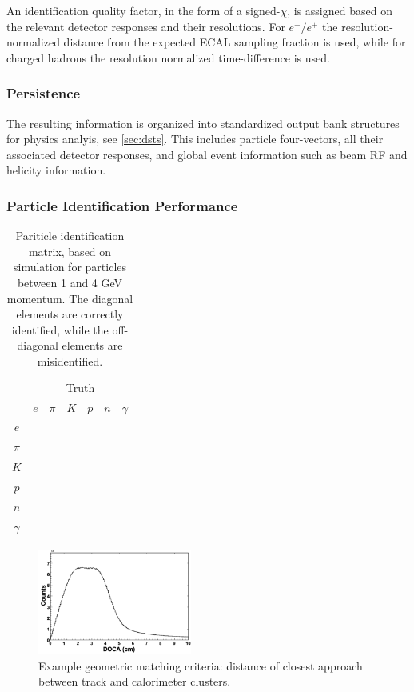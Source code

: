 An identification quality factor, in the form of a signed-$\chi$, is assigned based on the relevant detector responses and their resolutions.  For $e^-/e^+$ the resolution-normalized distance from the expected ECAL sampling fraction is used, while for charged hadrons the resolution normalized time-difference is used.

\subsubsection{Persistence}
The resulting information is organized into standardized output bank structures for physics analyis, see \ref{sec:dsts}.  This includes particle four-vectors, all their associated detector responses, and global event information such as beam RF and helicity information.


\subsubsection{Particle Identification Performance}

\begin{table}[htpb]
  \begin{center}
    \label{tab:pidmatrix}
    \begin{tabular}{|c|cccccc|}\hline
          & \multicolumn{6}{c|}{Truth}\\        
          & $e$ & $\pi$ & $K$ & $p$ & $n$ & $\gamma$ \\\hline
  $e$     &     &       &     &     &     &          \\ 
  $\pi$   &     &       &     &     &     &          \\ 
  $K$     &     &       &     &     &     &          \\ 
  $p$     &     &       &     &     &     &          \\ 
  $n$     &     &       &     &     &     &          \\ 
 $\gamma$ &     &       &     &     &     &          \\\hline 
    \end{tabular}
  \caption{Pariticle identification matrix, based on simulation for particles between 1 and 4 GeV momentum.  The diagonal elements are correctly identified, while the off-diagonal elements are misidentified.}
  \end{center}
\end{table}

\begin{figure}
\centering
\includegraphics[width=0.45\textwidth,height=0.2\textheight]{pics/pcal-doca.png}
\caption{Example geometric matching criteria:  distance of closest approach between track and calorimeter clusters.\label{fig:ebmatch}}
\end{figure}

